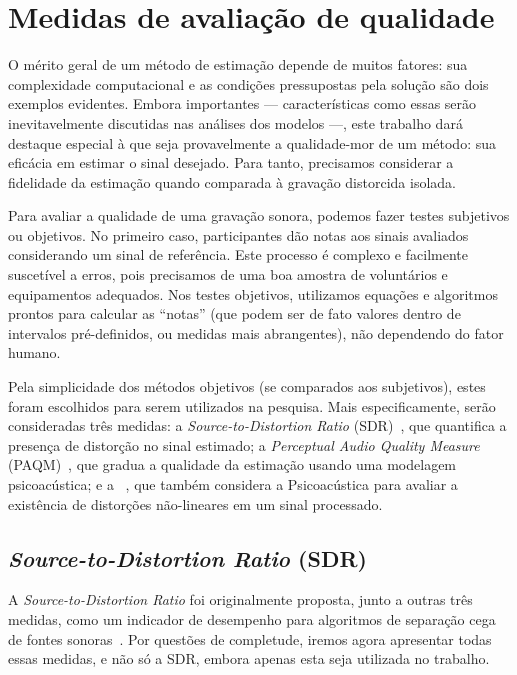 \chapter{Medidas de avaliação de qualidade}
\label{chapter:metrics}

O mérito geral de um método de estimação depende de muitos fatores: sua complexidade
computacional e as condições pressupostas pela solução são dois exemplos evidentes.
Embora importantes --- características como essas serão inevitavelmente discutidas nas
análises dos modelos ---, este trabalho dará destaque especial à que seja provavelmente
a qualidade-mor de um método: sua eficácia em estimar o sinal desejado. Para tanto,
precisamos considerar a fidelidade da estimação quando comparada à gravação distorcida
isolada.

Para avaliar a qualidade de uma gravação sonora, podemos fazer testes subjetivos ou
objetivos. No primeiro caso, participantes dão notas aos sinais avaliados considerando
um sinal de referência. Este processo é complexo e facilmente suscetível a erros, pois
precisamos de uma boa amostra de voluntários e equipamentos adequados. Nos testes
objetivos, utilizamos equações e algoritmos prontos para calcular as ``notas'' (que
podem ser de fato valores dentro de intervalos pré-definidos, ou medidas mais
abrangentes), não dependendo do fator humano.

Pela simplicidade dos métodos objetivos (se comparados aos subjetivos), estes foram
escolhidos para serem utilizados na pesquisa. Mais especificamente, serão consideradas
três medidas: a \textit{Source-to-Distortion Ratio}
(SDR)~\cite{vincent-2006}, que
quantifica a presença de distorção no sinal estimado; a \textit{Perceptual Audio
	Quality Measure} (PAQM)~\cite{beerends-1992}, que gradua a qualidade da estimação usando uma
modelagem psicoacústica; e a \rnonlin{}~\cite{tan-2004}, que também considera a
Psicoacústica para avaliar a existência de distorções não-lineares em um sinal
processado.

\section{\textit{Source-to-Distortion Ratio} (SDR)}
\label{section:metrics:sdr}

A \textit{Source-to-Distortion Ratio} foi originalmente proposta, junto a outras três
medidas, como um indicador de desempenho para algoritmos de separação cega de fontes
sonoras~\cite{vincent-2006}. Por questões de completude, iremos agora apresentar todas
essas medidas, e não só a SDR, embora apenas esta seja utilizada no trabalho.

